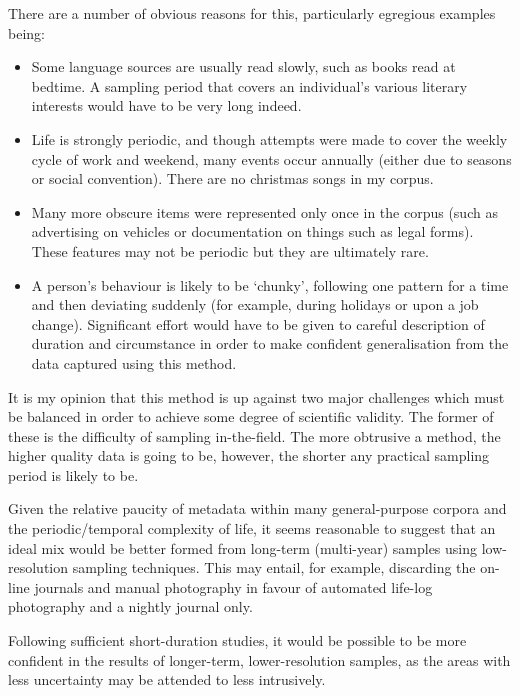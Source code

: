 There are a number of obvious reasons for this, particularly egregious examples being:

\begin{itemize}
    \item Some language sources are usually read slowly, such as books read at bedtime.  A sampling period that covers an individual's various literary interests would have to be very long indeed.
    \item Life is strongly periodic, and though attempts were made to cover the weekly cycle of work and weekend, many events occur annually (either due to seasons or social convention).  There are no christmas songs in my corpus.
    \item Many more obscure items were represented only once in the corpus (such as advertising on vehicles or documentation on things such as legal forms).  These features may not be periodic but they are ultimately rare.
    \item A person's behaviour is likely to be `chunky', following one pattern for a time and then deviating suddenly (for example, during holidays or upon a job change).  Significant effort would have to be given to careful description of duration and circumstance in order to make confident generalisation from the data captured using this method.
\end{itemize}

It is my opinion that this method is up against two major challenges which must be balanced in order to achieve some degree of scientific validity.  The former of these is the difficulty of sampling in-the-field.  The more obtrusive a method, the higher quality data is going to be, however, the shorter any practical sampling period is likely to be.

Given the relative paucity of metadata within many general-purpose corpora and the periodic/temporal complexity of life, it seems reasonable to suggest that an ideal mix would be better formed from long-term (multi-year) samples using low-resolution sampling techniques.  This may entail, for example, discarding the on-line journals and manual photography in favour of automated life-log photography and a nightly journal only.

Following sufficient short-duration studies, it would be possible to be more confident in the results of longer-term, lower-resolution samples, as the areas with less uncertainty may be attended to less intrusively.







